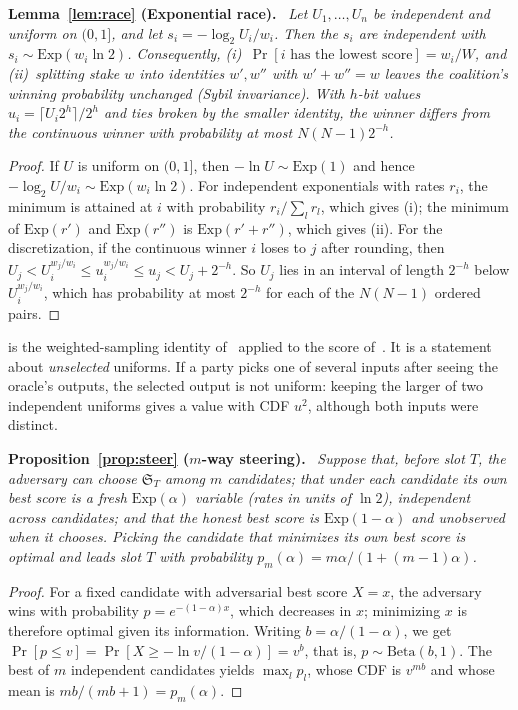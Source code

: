 \documentclass[10pt,journal,compsoc]{IEEEtran}
\theoremstyle{tplain}
\theoremstyle{tdef}
\theoremstyle{remark}
\newcommand{\cS}{\mathfrak{S}}
\newenvironment{restate}[1]{\par\smallskip\noindent\textbf{#1.}\ \itshape\ignorespaces}{\par\smallskip}
\begin{document}
\begin{restate}{Lemma~\ref{lem:race} (Exponential race)}
Let $U_1,\dots,U_n$ be independent and uniform on $(0,1]$, and let $s_i=-\log_2 U_i/w_i$. Then the $s_i$ are independent with $s_i\sim\mathrm{Exp}(w_i\ln 2)$. Consequently, (i)~$\Pr[i\text{ has the lowest score}]=w_i/W$, and (ii)~splitting stake $w$ into identities $w',w''$ with $w'+w''=w$ leaves the coalition's winning probability unchanged (Sybil invariance). With $h$-bit values $u_i=\lceil U_i2^h\rceil/2^h$ and ties broken by the smaller identity, the winner differs from the continuous winner with probability at most $N(N-1)2^{-h}$.
\end{restate}
\begin{proof}
If $U$ is uniform on $(0,1]$, then $-\ln U\sim\mathrm{Exp}(1)$ and hence $-\log_2 U/w_i\sim\mathrm{Exp}(w_i\ln 2)$. For independent exponentials with rates $r_i$, the minimum is attained at $i$ with probability $r_i/\sum_l r_l$, which gives (i); the minimum of $\mathrm{Exp}(r')$ and $\mathrm{Exp}(r'')$ is $\mathrm{Exp}(r'+r'')$, which gives (ii). For the discretization, if the continuous winner $i$ loses to $j$ after rounding, then $U_j<U_i^{w_j/w_i}\le u_i^{w_j/w_i}\le u_j<U_j+2^{-h}$. So $U_j$ lies in an interval of length $2^{-h}$ below $U_i^{w_j/w_i}$, which has probability at most $2^{-h}$ for each of the $N(N-1)$ ordered pairs.
\end{proof}

\noindent{} is the weighted-sampling identity of~\cite{efraimidis2006} applied to the score of~\cite{QRL}. It is a statement about \emph{unselected} uniforms. If a party picks one of several inputs after seeing the oracle's outputs, the selected output is not uniform: keeping the larger of two independent uniforms gives a value with CDF $u^2$, although both inputs were distinct.

\begin{restate}{Proposition~\ref{prop:steer} ($m$-way steering)}
Suppose that, before slot $T$, the adversary can choose $\cS_T$ among $m$ candidates; that under each candidate its own best score is a fresh $\mathrm{Exp}(\alpha)$ variable (rates in units of $\ln 2$), independent across candidates; and that the honest best score is $\mathrm{Exp}(1-\alpha)$ and unobserved when it chooses. Picking the candidate that minimizes its own best score is optimal and leads slot $T$ with probability $p_m(\alpha)=m\alpha/(1+(m-1)\alpha)$.
\end{restate}
\begin{proof}
For a fixed candidate with adversarial best score $X=x$, the adversary wins with probability $p=e^{-(1-\alpha)x}$, which decreases in $x$; minimizing $x$ is therefore optimal given its information. Writing $b=\alpha/(1-\alpha)$, we get $\Pr[p\le v]=\Pr[X\ge-\ln v/(1-\alpha)]=v^{b}$, that is, $p\sim\mathrm{Beta}(b,1)$. The best of $m$ independent candidates yields $\max_l p_l$, whose CDF is $v^{mb}$ and whose mean is $mb/(mb+1)=p_m(\alpha)$.
\end{proof}
\end{document}
